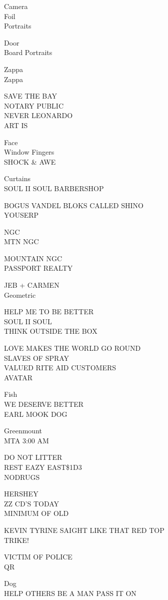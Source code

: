 \documentclass[10pt,letterpaper]{article}
\begin{document}
Camera\\
Foil\\
Portraits

Door\\
Board Portraits

Zappa\\
Zappa

SAVE THE BAY\\
NOTARY PUBLIC\\
NEVER LEONARDO\\
ART IS

Face\\
Window Fingers\\
SHOCK \& AWE

Curtains\\
SOUL II SOUL BARBERSHOP

BOGUS VANDEL BLOKS CALLED SHINO\\
YOUSERP

NGC\\
MTN NGC

MOUNTAIN NGC\\
PASSPORT REALTY

JEB + CARMEN\\
Geometric

HELP ME TO BE BETTER\\
SOUL II SOUL\\
THINK OUTSIDE THE BOX

LOVE MAKES THE WORLD GO ROUND\\
SLAVES OF SPRAY\\
VALUED RITE AID CUSTOMERS\\
AVATAR

Fish\\
WE DESERVE BETTER\\
EARL MOOK DOG

Greenmount\\
MTA 3:00 AM

DO NOT LITTER\\
REST EAZY EAST\$1D3\\
NODRUGS

HERSHEY\\
ZZ CD'S TODAY\\
MINIMUM OF OLD

KEVIN TYRINE SAIGHT LIKE THAT RED TOP\\
TRIKE!

VICTIM OF POLICE\\
QR

Dog\\
HELP OTHERS BE A MAN PASS IT ON
\end{document}
